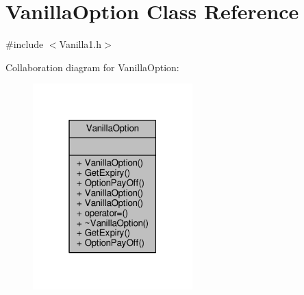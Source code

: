 \hypertarget{classVanillaOption}{}\section{Vanilla\+Option Class Reference}
\label{classVanillaOption}


{\ttfamily \#include $<$Vanilla1.\+h$>$}



Collaboration diagram for Vanilla\+Option\+:
\nopagebreak
\begin{figure}[H]
\begin{center}
\leavevmode
\includegraphics[width=175pt]{classVanillaOption__coll__graph}
\end{center}
\end{figure}
